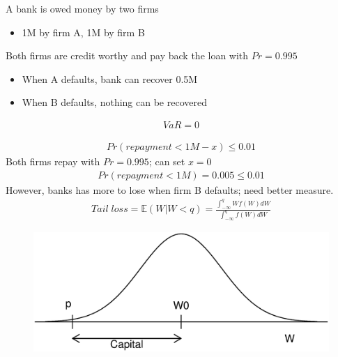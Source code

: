 \documentclass{beamer}
\begin{document}
\begin{frame} 
  A bank is owed money by two firms
  \begin{itemize}
    \item 1M by firm A, 1M by firm B
  \end{itemize}
  \medskip
  Both firms are credit worthy and pay back the loan with $Pr=0.995$
  \begin{itemize}
    \item When A defaults, bank can recover 0.5M
    \item When B defaults, nothing can be recovered
  \end{itemize}
  \begin{align}
    VaR=0
  \end{align}
\end{frame}

\begin{frame}
 \begin{align}
   Pr(repayment < 1M-x)\leq 0.01
 \end{align}
 Both firms repay with $Pr=0.995$; can set $x=0$
 \begin{align}
   Pr(repayment < 1M)=0.005 \leq 0.01
 \end{align}
 However, banks has more to lose when firm B defaults; need better measure.
 \begin{align}
    Tail\;loss = \mathbb{E}(W|W<q) = \frac{\int^q_{-\infty}Wf(W)dW}{\int^q_{-\infty}f(W)dW}
  \end{align}
\end{frame}

\begin{frame}
  \begin{figure}
    \includegraphics[scale=.3]{VaR2.eps}
  \end{figure}
\end{frame}
\end{document}

